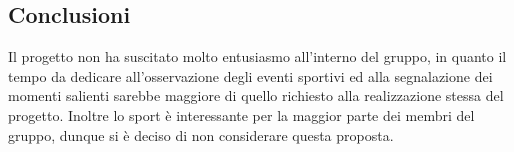 \documentclass[../studio-di-fattibilita.tex]{subfiles}
\begin{document}
\subsection{Conclusioni}%
\label{subsec:conclusioni}
Il progetto non ha suscitato molto entusiasmo all'interno del gruppo, in quanto il tempo da dedicare all'osservazione degli eventi sportivi ed alla segnalazione dei momenti salienti sarebbe maggiore di quello richiesto alla realizzazione stessa del progetto. Inoltre lo sport è interessante per la maggior parte dei membri del gruppo, dunque si è deciso di non considerare questa proposta.
\end{document}

